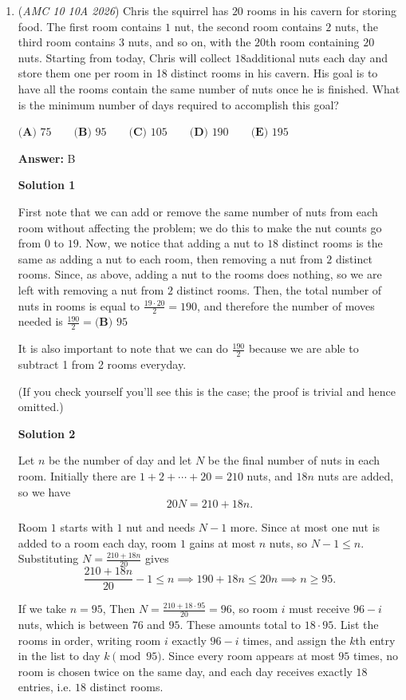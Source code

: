 \begin{enumerate}
 


	\item (\textit{AMC 10 10A 2026}) Chris the squirrel has $20$ rooms in his cavern for storing food. The first room contains $1$ nut,
the second room contains $2$ nuts, the third room contains $3$ nuts, and so on, with the $20$th
room containing $20$ nuts. Starting from today, Chris will collect $18$additional nuts each day
and store them one per room in 18 distinct rooms in his cavern. His goal is to have all the
rooms contain the same number of nuts once he is finished. What is the minimum number
of days required to accomplish this goal?


 $\textbf{(A) } 75\qquad\textbf{(B) }95\qquad\textbf{(C) }105\qquad\textbf{(D) }190\qquad\textbf{(E) }195$

 \textbf{Answer: }B



\textbf{Solution 1}

First note that we can add or remove the same number of nuts from each room without affecting the problem; we do this to make the nut counts go from $0$ to $19$. Now, we notice that adding a nut to $18$ distinct rooms is the same as adding a nut to each room, then removing a nut from $2$ distinct rooms. Since, as above, adding a nut to the rooms does nothing, so we are left with removing a nut from $2$ distinct rooms. Then, the total number of nuts in rooms is equal to $\frac{19\cdot20}{2}=190$, and therefore the number of moves needed is $\frac{190}{2}= \boxed{\textbf{(B) }95}$

 It is also important to note that we can do $\frac{190}{2}$ because we are able to subtract 1 from 2 rooms everyday.

 (If you check yourself you'll see this is the case; the proof is trivial and hence omitted.)

 



\textbf{Solution 2}

Let $n$ be the number of day and let $N$ be the final number of nuts in each room. Initially there are $1+2+\cdots+20=210$ nuts, and $18n$ nuts are added, so we have
 \[20N=210+18n.\]

 Room $1$ starts with $1$ nut and needs $N-1$ more. Since at most one nut is added to a room each day, room $1$ gains at most $n$ nuts, so $N-1\le n$. Substituting $N=\frac{210+18n}{20}$ gives
 \[\frac{210+18n}{20}-1\le n\implies 190+18n\le 20n\implies n\ge 95.\]

 If we take $n=95$, Then $N=\frac{210+18\cdot 95}{20}=96$, so room $i$ must receive $96-i$ nuts, which is between $76$ and $95$. These amounts total to $18\cdot 95$. List the rooms in order, writing room $i$ exactly $96-i$ times, and assign the $k$th entry in the list to day $k \pmod{95}$. Since every room appears at most $95$ times, no room is chosen twice on the same day, and each day receives exactly $18$ entries, i.e. $18$ distinct rooms. 


\end{enumerate}
